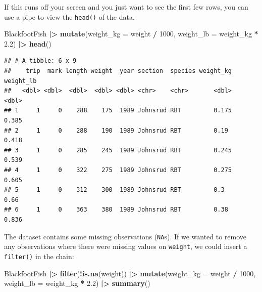 \documentclass[
  10pt,
  letterpaper,
  twoside,
  openright]{book}
\newenvironment{Shaded}{\begin{snugshade}}{\end{snugshade}}
\newcommand{\AttributeTok}[1]{\textcolor[rgb]{0.13,0.29,0.53}{#1}}
\newcommand{\DecValTok}[1]{\textcolor[rgb]{0.00,0.00,0.81}{#1}}
\newcommand{\FloatTok}[1]{\textcolor[rgb]{0.00,0.00,0.81}{#1}}
\newcommand{\FunctionTok}[1]{\textcolor[rgb]{0.13,0.29,0.53}{\textbf{#1}}}
\newcommand{\NormalTok}[1]{#1}
\newcommand{\SpecialCharTok}[1]{\textcolor[rgb]{0.81,0.36,0.00}{\textbf{#1}}}
\begin{document}
If this runs off your screen and you just want to see the first few
rows, you can use a pipe to view the \texttt{head()} of the data.

\begin{Shaded}
\begin{Highlighting}[]
\NormalTok{BlackfootFish }\SpecialCharTok{|\textgreater{}}
  \FunctionTok{mutate}\NormalTok{(}\AttributeTok{weight\_kg =}\NormalTok{ weight }\SpecialCharTok{/} \DecValTok{1000}\NormalTok{,}
         \AttributeTok{weight\_lb =}\NormalTok{ weight\_kg }\SpecialCharTok{*} \FloatTok{2.2}\NormalTok{) }\SpecialCharTok{|\textgreater{}}
  \FunctionTok{head}\NormalTok{()}
\end{Highlighting}
\end{Shaded}

\begin{verbatim}
## # A tibble: 6 x 9
##    trip  mark length weight  year section  species weight_kg weight_lb
##   <dbl> <dbl>  <dbl>  <dbl> <dbl> <chr>    <chr>       <dbl>     <dbl>
## 1     1     0    288    175  1989 Johnsrud RBT         0.175     0.385
## 2     1     0    288    190  1989 Johnsrud RBT         0.19      0.418
## 3     1     0    285    245  1989 Johnsrud RBT         0.245     0.539
## 4     1     0    322    275  1989 Johnsrud RBT         0.275     0.605
## 5     1     0    312    300  1989 Johnsrud RBT         0.3       0.66 
## 6     1     0    363    380  1989 Johnsrud RBT         0.38      0.836
\end{verbatim}

The dataset contains some missing observations (\texttt{NA}s). If we
wanted to remove any observations where there were missing values on
\texttt{weight}, we could insert a \texttt{filter()} in the chain:

\begin{Shaded}
\begin{Highlighting}[]
\NormalTok{BlackfootFish }\SpecialCharTok{|\textgreater{}}
  \FunctionTok{filter}\NormalTok{(}\SpecialCharTok{!}\FunctionTok{is.na}\NormalTok{(weight)) }\SpecialCharTok{|\textgreater{}}
  \FunctionTok{mutate}\NormalTok{(}\AttributeTok{weight\_kg =}\NormalTok{ weight }\SpecialCharTok{/} \DecValTok{1000}\NormalTok{,}
         \AttributeTok{weight\_lb =}\NormalTok{ weight\_kg }\SpecialCharTok{*} \FloatTok{2.2}\NormalTok{) }\SpecialCharTok{|\textgreater{}}
  \FunctionTok{summary}\NormalTok{()}
\end{Highlighting}
\end{Shaded}
\end{document}
